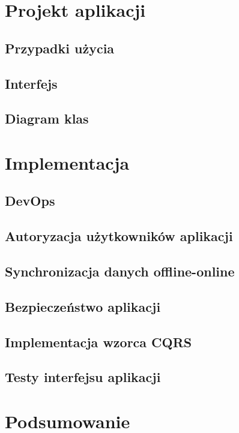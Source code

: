 \chapter{Projekt aplikacji}
\section{Przypadki użycia}
\section{Interfejs}
\section{Diagram klas}
\chapter{Implementacja}
\section{DevOps}
\section{Autoryzacja użytkowników aplikacji}
\section{Synchronizacja danych offline-online}
\section{Bezpieczeństwo aplikacji}
\section{Implementacja wzorca CQRS}
\label{sec:cqrs}
\section{Testy interfejsu aplikacji}
\chapter{Podsumowanie}
\printbibliography[nottype=misc, title={Bibliografia},resetnumbers=true,heading=bibintoc]
\begin{refcontext}[labelprefix=L]
\printbibliography[type=misc, title={Netografia},resetnumbers=true,heading=bibintoc]
\end{refcontext}
